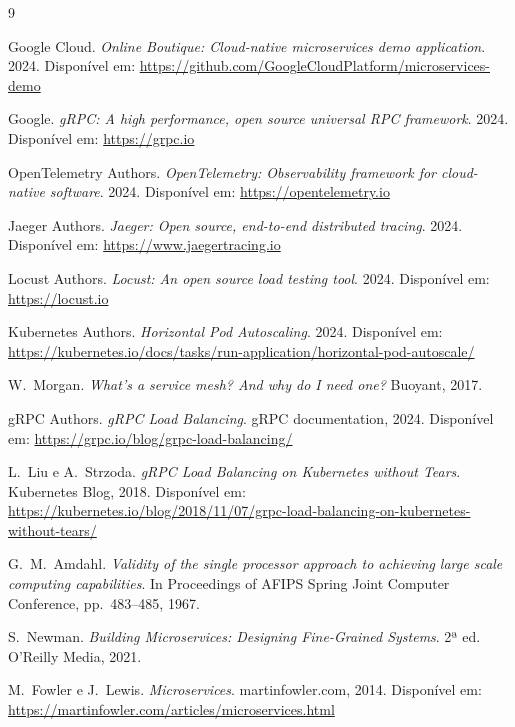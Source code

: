 \documentclass[manuscript,oneside]{acmart}
\begin{document}

\begin{thebibliography}{9}

Google Cloud. \textit{Online Boutique: Cloud-native microservices demo application}. 2024. Disponível em: \url{https://github.com/GoogleCloudPlatform/microservices-demo}

Google. \textit{gRPC: A high performance, open source universal RPC framework}. 2024. Disponível em: \url{https://grpc.io}

OpenTelemetry Authors. \textit{OpenTelemetry: Observability framework for cloud-native software}. 2024. Disponível em: \url{https://opentelemetry.io}

Jaeger Authors. \textit{Jaeger: Open source, end-to-end distributed tracing}. 2024. Disponível em: \url{https://www.jaegertracing.io}

Locust Authors. \textit{Locust: An open source load testing tool}. 2024. Disponível em: \url{https://locust.io}

Kubernetes Authors. \textit{Horizontal Pod Autoscaling}. 2024. Disponível em: \url{https://kubernetes.io/docs/tasks/run-application/horizontal-pod-autoscale/}

W.\ Morgan. \textit{What's a service mesh? And why do I need one?} Buoyant, 2017.

gRPC Authors. \textit{gRPC Load Balancing}. gRPC documentation, 2024. Disponível em: \url{https://grpc.io/blog/grpc-load-balancing/}

L.\ Liu e A.\ Strzoda. \textit{gRPC Load Balancing on Kubernetes without Tears}. Kubernetes Blog, 2018. Disponível em: \url{https://kubernetes.io/blog/2018/11/07/grpc-load-balancing-on-kubernetes-without-tears/}

G.\ M.\ Amdahl. \textit{Validity of the single processor approach to achieving large scale computing capabilities}. In Proceedings of AFIPS Spring Joint Computer Conference, pp.\ 483--485, 1967.

S.\ Newman. \textit{Building Microservices: Designing Fine-Grained Systems}. 2ª ed. O'Reilly Media, 2021.

M.\ Fowler e J.\ Lewis. \textit{Microservices}. martinfowler.com, 2014. Disponível em: \url{https://martinfowler.com/articles/microservices.html}

\end{thebibliography}
\end{document}
